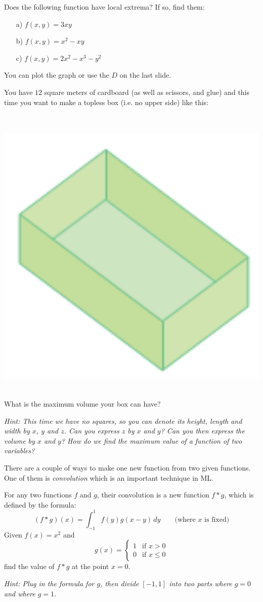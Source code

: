 \begin{problem}
Does  the following function have local extrema? If so, find them:
\begin{enumerate}
    \item[a) ] $f(x,y) = 3xy$
    \item[b) ] $f(x,y) = x^2-xy$
    \item[c) ] $f(x, y) = 2x^2 - x^3 - y^2$
    \end{enumerate}
You can  plot the graph  or use the $D$ on the last slide.
\end{problem}
\medskip



\begin{problem}
You have $12$ square meters of cardboard (as well as scissors, and glue) and this time you want to make a topless box (i.e. no upper side) like this:
\begin{center}
\\~\\
\includegraphics[width=0.3\linewidth]{figs/topless-box.png}
\\~\\
\end{center}
What is the maximum volume your box can have?



\smallskip 

{\small \textit{Hint:  This time we have no squares, so you can denote its height, length and width by $x$, $y$ and $z$. Can you express $z$ by $x$ and $y$? Can you then express the volume by $x$ and $y$? How do we find the maximum value of a function of two variables?}
    }
\end{problem}


\medskip
        

\begin{problem}
There are a couple of ways to make one new function from two given functions. One of them is \textit{convolution} which is an  important technique in ML.

For any two functions $f$ and $g$,  their convolution is a new function $f*g$, which is defined by the formula:
\[
(f*g)(x) = \int_{-1}^1 f(y)g(x-y) \, dy \qquad \text{(where $x$ is fixed)}
\]
Given $f(x)=x^2$ and \[g(x) = \begin{cases}
    1 & \text{if } x>0\\
    0 & \text{if } x \le 0
\end{cases}\]
find the value of $f*g$ at the point $x=0$.


\smallskip 

{\small \textit{Hint:  Plug in the formula for $g$, then divide $[-1,1]$ into two parts where $g=0$ and where $g=1$.}
    }
\end{problem}

